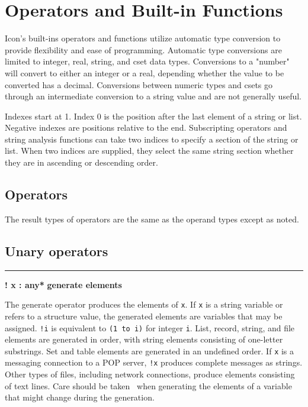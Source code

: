 \section{Operators and Built-in Functions}

Icon's built-ins operators and functions utilize
automatic type conversion to provide flexibility and ease of
programming. Automatic type
conversions are limited to
integer, real, string, and cset data types. Conversions to a "number" will
convert to either an integer or a real, depending whether the value to
be converted has a decimal. Conversions between numeric types and csets
go through an intermediate conversion to a string value and are not
generally useful.

Indexes start at 1. Index 0 is the position after the last element of a
string or list. Negative indexes are positions
relative to the end. Subscripting operators and string analysis
functions can take two indices to specify a section of the string or
list. When two indices are supplied, they select the same string
section whether they are in ascending or descending order.

\subsection*{Operators}

The result types of operators are the same as the
operand types except as noted.

\subsection*{Unary operators}

\bigskip\hrule\vspace{0.1cm}
\noindent
{\bf ! x : any* } \hfill {\bf generate elements}

\noindent
{}The generate
operator produces the elements of \texttt{x}. If
\texttt{x} is a string variable or refers to a structure value, the
generated elements are variables that may be assigned. \texttt{!i} is
equivalent to \texttt{(1 to i)} for integer \texttt{i}. List, record,
string, and file elements are generated in order, with string elements
consisting of one-letter substrings. Set and table elements are
generated in an undefined order. If \texttt{x} is a messaging
connection to a POP server, \texttt{!x} produces complete messages as
strings. Other types of files, including network connections, produce
elements consisting of text lines.
Care should be taken \WarningNotThreadSafe\ when generating the elements
of a variable that might change during the generation.

